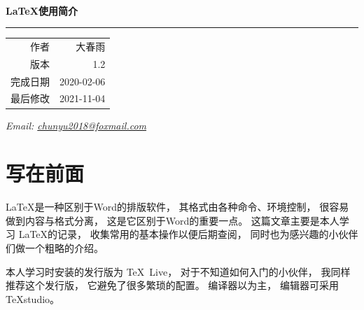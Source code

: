 \documentclass[UTF8]{ctexart}
\numberwithin{equation}{section}			%
\begin{document}
    \begin{titlepage}
        \ %
        
        \vspace{\fill}
        
        \begin{flushright}
            {\Huge\bfseries\LaTeX 使用简介} \\
            \rule[1em]{\linewidth}{0.5ex}
            
            \begin{tabular}{rr}
                作者 & 大春雨 \\
                版本 & 1.2 \\
                完成日期 & 2020-02-06 \\
                最后修改 & 2021-11-04 \\
            \end{tabular}
        \end{flushright}
        
        
        {\noindent\slshape Email: 
         \href{mailto:chunyu2018@foxmail.com}
            {chunyu2018@foxmail.com}
        }
    \end{titlepage}

    
    \tableofcontents		%
    \clearpage
    
    \listoftables
    \clearpage
    
    \setcounter{page}{1}	%
    
    \section{写在前面}
    \LaTeX 是一种区别于Word的排版软件，
    其格式由各种命令、环境控制，
    很容易做到内容与格式分离，
    这是它区别于Word的重要一点。
    这篇文章主要是本人学习 \LaTeX 的记录\cite{liuhaiyang}，
    收集常用的基本操作以便后期查阅，
    同时也为感兴趣的小伙伴们做一个粗略的介绍。
    
    本人学习时安装的发行版为 \TeX~Live，
    对于不知道如何入门的小伙伴，
    我同样推荐这个发行版，
    它避免了很多繁琐的配置。
    编译器以\XeLaTeX 为主，
    编辑器可采用TeXstudio。
    
\end{document}
